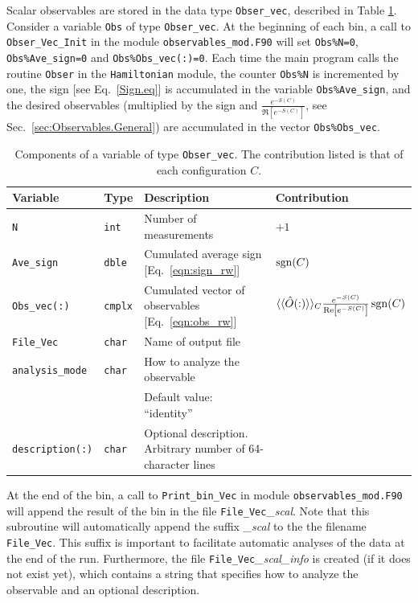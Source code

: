 Scalar observables are stored in the data type \texttt{Obser\_vec}, described in Table \ref{table:Obser_vec}. Consider  a variable \texttt{Obs} of type  \texttt{Obser\_vec}.  At the beginning of each bin,  a call to  \texttt{Obser\_Vec\_Init} in the module \texttt{observables\_mod.F90}  will  set   \texttt{Obs\%N=0},   \texttt{Obs\%Ave\_sign=0}  and  \texttt{Obs\%Obs\_vec(:)=0}.  Each time the main  program calls the routine \texttt{Obser}  in the  \texttt{Hamiltonian} module,  the counter \texttt{Obs\%N}   is incremented by one, the sign  [see Eq.~\eqref{Sign.eq}] is accumulated in the  variable \texttt{Obs\%Ave\_sign},  and the desired observables (multiplied by the sign and   $\frac{e^{-S(C)}} {\Re \left[e^{-S(C)} \right]}$, see Sec.~\ref{sec:Observables.General})  are accumulated in the vector \texttt{Obs\%Obs\_vec}.  
%
\begin{table}[h!]
	\begin{center}
   \begin{tabular}{@{} p{} @{ } p{} p{} l @{}}
   \toprule
    Variable                 &  Type          & Description &  Contribution \\
    \midrule
    \texttt{N}               & \texttt{int}   & Number of measurements &    $+1$ \\
    \texttt{Ave\_sign}       & \texttt{dble}  & Cumulated average sign [Eq.~\eqref{eqn:sign_rw}] & $\operatorname{sgn}(C)$  \\
    \texttt{Obs\_vec(:)}  	  & \texttt{cmplx} & Cumulated vector of observables [Eq.~\eqref{eqn:obs_rw}] &
           $ \langle \langle \hat{O}(:) \rangle \rangle_{C}\frac{e^{-S(C)}} {\operatorname{Re} \left[e^{-S(C)} \right]} \operatorname{sgn}(C) $ \\
     \texttt{File\_Vec}      & \texttt{char} & Name of output file  &\\
     \texttt{analysis\_mode} & \texttt{char} & How to analyze the observable &\\
                             &               & Default value: ``identity'' &\\
     \texttt{description(:)} & \texttt{char} & Optional description. Arbitrary number of 64-character lines &\\
     \bottomrule     
   \end{tabular}
   \caption{Components of a variable of type \texttt{Obser\_vec}. The contribution listed is that of each configuration $C$.}
         \label{table:Obser_vec}
     \end{center}
\end{table}
%
At the end of the bin, a call to \texttt{Print\_bin\_Vec} in module \texttt{observables\_mod.F90} will append the result of the bin in the file \texttt{File\_Vec}\emph{\_scal}.  Note that this subroutine will automatically append the suffix \emph{\_scal} to the the filename \texttt{File\_Vec}.
This suffix  is important to facilitate automatic analyses of the data at the end of the run.
Furthermore, the file \texttt{File\_Vec}\emph{\_scal\_info} is created (if it does not exist yet), which contains a string that specifies how to analyze the observable and an optional description.

